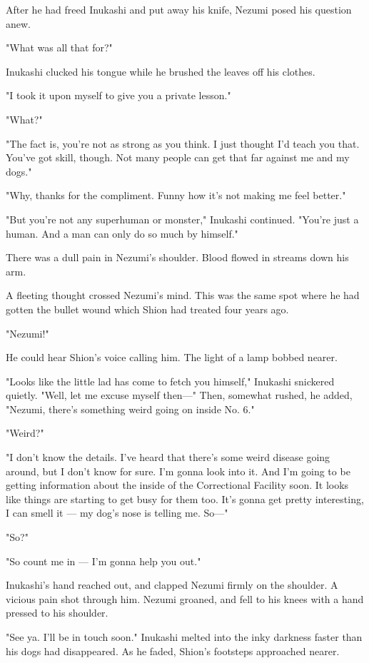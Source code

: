 After he had freed Inukashi and put away his knife, Nezumi posed his
question anew.

"What was all that for?"

Inukashi clucked his tongue while he brushed the leaves off his clothes.

"I took it upon myself to give you a private lesson."

"What?"

"The fact is, you're not as strong as you think. I just thought I'd
teach you that. You've got skill, though. Not many people can get that
far against me and my dogs."

"Why, thanks for the compliment. Funny how it's not making me feel
better."

"But you're not any superhuman or monster," Inukashi continued. "You're
just a human. And a man can only do so much by himself."

There was a dull pain in Nezumi's shoulder. Blood flowed in streams down
his arm.

A fleeting thought crossed Nezumi's mind. This was the same spot where
he had gotten the bullet wound which Shion had treated four years ago.

"Nezumi!"

He could hear Shion's voice calling him. The light of a lamp bobbed
nearer.

"Looks like the little lad has come to fetch you himself," Inukashi
snickered quietly. "Well, let me excuse myself then---" Then, somewhat
rushed, he added, "Nezumi, there's something weird going on inside No.
6."

"Weird?"

"I don't know the details. I've heard that there's some weird disease
going around, but I don't know for sure. I'm gonna look into it. And I'm
going to be getting information about the inside of the Correctional
Facility soon. It looks like things are starting to get busy for them
too. It's gonna get pretty interesting, I can smell it --- my dog's nose
is telling me. So---"

"So?"

"So count me in --- I'm gonna help you out."

Inukashi's hand reached out, and clapped Nezumi firmly on the shoulder.
A vicious pain shot through him. Nezumi groaned, and fell to his knees
with a hand pressed to his shoulder.

"See ya. I'll be in touch soon." Inukashi melted into the inky darkness
faster than his dogs had disappeared. As he faded, Shion's footsteps
approached nearer.


